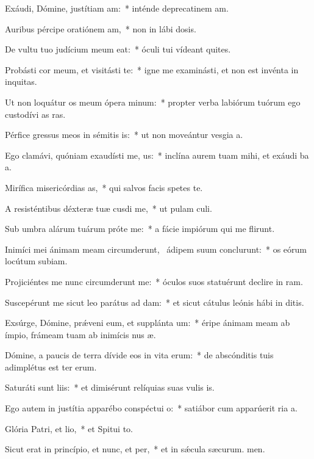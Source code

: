 \item Exáudi, Dómine, justítiam am:~* inténde deprecatinem am.
\item Auribus pércipe oratiónem am,~* non in lábi dosis.
\item De vultu tuo judícium meum eat:~* óculi tui vídeant quites.
\item Probásti cor meum, et visitásti te:~* igne me examinásti, et non est invénta in  inquitas.
\item Ut non loquátur os meum ópera minum:~* propter verba labiórum tuórum ego custodívi as ras.
\item Pérfice gressus meos in sémitis is:~* ut non moveántur vesgia a.
\item Ego clamávi, quóniam exaudísti me, us:~* inclína aurem tuam mihi, et exáudi ba a.
\item Mirífica misericórdias as,~* qui salvos facis spetes  te.
\item A resisténtibus déxteræ tuæ cusdi me,~* ut pulam culi.
\item Sub umbra alárum tuárum próte me:~* a fácie impiórum qui me flirunt.
\item Inimíci mei ánimam meam circumderunt,~\pscross{} ádipem suum conclurunt:~* os eórum locútum  subiam.
\item Projiciéntes me nunc circumderunt me:~* óculos suos statuérunt declire in ram.
\item Suscepérunt me sicut leo parátus ad dam:~* et sicut cátulus leónis hábi in ditis.
\item Exsúrge, Dómine, prǽveni eum, et supplánta um:~* éripe ánimam meam ab ímpio, frámeam tuam ab inimícis nus æ.
\item Dómine, a paucis de terra dívide eos in vita erum:~* de abscónditis tuis adimplétus est ter erum.
\item Saturáti sunt liis:~* et dimisérunt relíquias suas vulis is.
\item Ego autem in justítia apparébo conspéctui o:~* satiábor cum apparúerit ria a.
\item Glória Patri, et lio,~* et Spitui to.
\item Sicut erat in princípio, et nunc, et per,~* et in sǽcula sæcurum. men.
